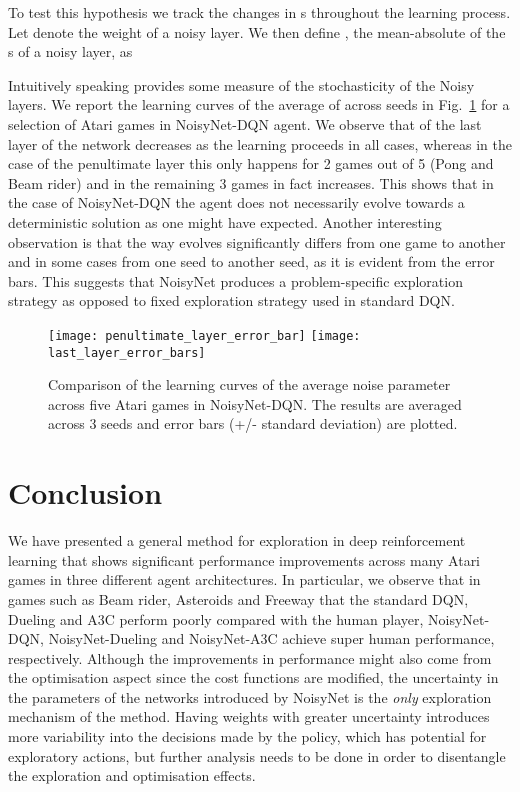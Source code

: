 \documentclass{article}
\newcommand{\algoinit}{NoisyNet}
\begin{document}
To test this hypothesis we track the changes in s throughout the learning process. Let   denote the  weight of a noisy layer. We then define , the mean-absolute of the s of a noisy layer, as

Intuitively speaking  provides some measure of the stochasticity of the Noisy layers. We report the learning curves of the average of  across  seeds in Fig.~\ref{fig:sigma_curves} for a selection of Atari games in NoisyNet-DQN agent. We observe that  of the last layer of the network decreases as the learning proceeds in all cases, whereas in the case of the penultimate layer this only happens for 2 games out of 5 (Pong and Beam rider) and in the remaining 3 games  in fact increases. This shows that in the case of NoisyNet-DQN the agent does not necessarily evolve towards a deterministic solution as one might have expected. Another interesting observation is that the way  evolves significantly differs from one game to another and in some cases from one seed to another seed, as it is evident from the error bars. This suggests that NoisyNet produces a problem-specific exploration strategy as opposed to fixed exploration strategy used in standard DQN.      
\begin{centering}
\begin{figure}[ht!]
    \texttt{[image: penultimate\_layer\_error\_bar]}
    \texttt{[image: last\_layer\_error\_bars]}
    \caption{Comparison of the learning curves of the average noise parameter  across five Atari games in NoisyNet-DQN. The results are averaged across 3 seeds and error bars (+/- standard deviation) are plotted.}
    \label{fig:sigma_curves} 
\end{figure}
\end{centering} 
\section{Conclusion}
\label{sec:conclusion}
We have presented a general method for exploration in deep reinforcement learning that shows significant performance improvements across many Atari games in three different agent architectures. In particular, we observe that in games such as Beam rider, Asteroids and Freeway that the standard DQN, Dueling and A3C perform poorly compared with the human player, \algoinit{}-DQN, \algoinit{}-Dueling  and \algoinit{}-A3C achieve super human performance, respectively. Although the improvements in performance might also come from the optimisation aspect since the cost functions are modified, the uncertainty in the parameters of the networks introduced by NoisyNet is the \textit{only} exploration mechanism of the method. Having weights with greater uncertainty introduces more variability into the decisions made by the policy, which has potential for exploratory actions, but further analysis needs to be done in order to disentangle the exploration and optimisation effects. 
 
\end{document}
